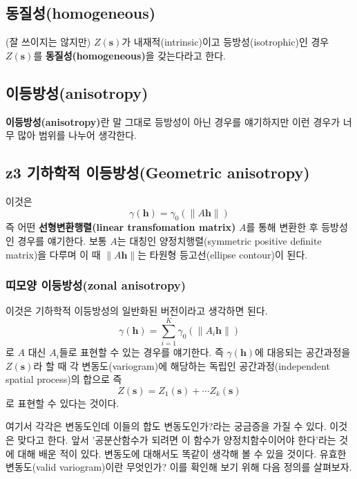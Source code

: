 \documentclass[b5paper,]{book}
\theoremstyle{definition}
\theoremstyle{definition}
\theoremstyle{definition}
\theoremstyle{remark}
\begin{document}
\subsection{동질성(homogeneous)}\label{homogeneous}

(잘 쓰이지는 않지만) \(Z(\mathbf{s})\)가 내재적(intrinsic)이고
등방성(isotrophic)인 경우 \(Z(\mathbf{s})\)를
\textbf{동질성(homogeneous)}을 갖는다라고 한다.

\subsection{이등방성(anisotropy)}\label{anisotropy}

\textbf{이등방성(anisotropy)}란 말 그대로 등방성이 아닌 경우를
얘기하지만 이런 경우가 너무 많아 범위를 나누어 생각한다.

\subsection{z3 기하학적 이등방성(Geometric
anisotropy)}\label{z3--geometric-anisotropy}

이것은 \[\gamma(\mathbf{h})=\gamma_{0}(\|A\mathbf{h}\|)\] 즉 어떤
\textbf{선형변환행렬(linear transfomation matrix)} \(A\)를 통해 변환한
후 등방성인 경우를 얘기한다. 보통 \(A\)는 대칭인 양정치행렬(symmetric
positive definite matrix)을 다루며 이 때 \(\|A\mathbf{h}\|\)는 타원형
등고선(ellipse contour)이 된다.

\subsubsection{띠모양 이등방성(zonal
anisotropy)}\label{-zonal-anisotropy}

이것은 기하학적 이등방성의 일반화된 버전이라고 생각하면 된다.
\[\gamma(\mathbf{h})=\sum_{i=1}^{K}\gamma_{0}(\|A_{i}\mathbf{h}\|)\] 로
\(A\) 대신 \(A_{i}\)들로 표현할 수 있는 경우를 얘기한다. 즉
\(\gamma(\mathbf{h})\)에 대응되는 공간과정을 \(Z(\mathbf{s})\)라 할 때
각 변동도(variogram)에 해당하는 독립인 공간과정(independent spatial
process)의 합으로 즉
\[Z(\mathbf{s})=Z_{1}(\mathbf{s})+ \cdots Z_{k}(\mathbf{s})\] 로 표현할
수 있다는 것이다.

여기서 각각은 변동도인데 이들의 합도 변동도인가?라는 궁금증을 가질 수
있다. 이것은 맞다고 한다. 앞서 '공분산함수가 되려면 이 함수가
양정치함수이어야 한다'라는 것에 대해 배운 적이 있다. 변동도에 대해서도
똑같이 생각해 볼 수 있을 것이다. 유효한 변동도(valid variogram)이란
무엇인가? 이를 확인해 보기 위해 다음 정의를 살펴보자.
\end{document}
